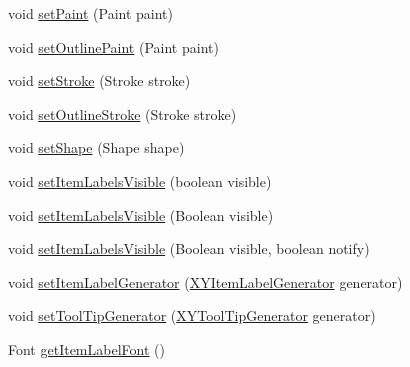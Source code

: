 \begin{DoxyCompactItemize}
\item 
void \mbox{\hyperlink{interfaceorg_1_1jfree_1_1chart_1_1renderer_1_1xy_1_1_x_y_item_renderer_aa9b5df17f4ddc8fa6f034e8facbbfac3}{set\+Paint}} (Paint paint)
\item 
void \mbox{\hyperlink{interfaceorg_1_1jfree_1_1chart_1_1renderer_1_1xy_1_1_x_y_item_renderer_afc0e80460d35d83afc906fede1089eeb}{set\+Outline\+Paint}} (Paint paint)
\item 
void \mbox{\hyperlink{interfaceorg_1_1jfree_1_1chart_1_1renderer_1_1xy_1_1_x_y_item_renderer_a473ce909b6895b827ae52a038a1cde4a}{set\+Stroke}} (Stroke stroke)
\item 
void \mbox{\hyperlink{interfaceorg_1_1jfree_1_1chart_1_1renderer_1_1xy_1_1_x_y_item_renderer_ab211328ae1646de135cfaa7b88b07a0a}{set\+Outline\+Stroke}} (Stroke stroke)
\item 
void \mbox{\hyperlink{interfaceorg_1_1jfree_1_1chart_1_1renderer_1_1xy_1_1_x_y_item_renderer_aca76bd279cbe0daa28abee703ce872c7}{set\+Shape}} (Shape shape)
\item 
void \mbox{\hyperlink{interfaceorg_1_1jfree_1_1chart_1_1renderer_1_1xy_1_1_x_y_item_renderer_a9805685b3c5802635d141addf290fc25}{set\+Item\+Labels\+Visible}} (boolean visible)
\item 
void \mbox{\hyperlink{interfaceorg_1_1jfree_1_1chart_1_1renderer_1_1xy_1_1_x_y_item_renderer_aaa1db57ae471204a43bfabfc6d8adbc2}{set\+Item\+Labels\+Visible}} (Boolean visible)
\item 
void \mbox{\hyperlink{interfaceorg_1_1jfree_1_1chart_1_1renderer_1_1xy_1_1_x_y_item_renderer_a1f35e9f8af8e853e5abea2b63f67afd8}{set\+Item\+Labels\+Visible}} (Boolean visible, boolean notify)
\item 
void \mbox{\hyperlink{interfaceorg_1_1jfree_1_1chart_1_1renderer_1_1xy_1_1_x_y_item_renderer_ac0a393bdb421d5fae14a1c5b0a0dc95b}{set\+Item\+Label\+Generator}} (\mbox{\hyperlink{interfaceorg_1_1jfree_1_1chart_1_1labels_1_1_x_y_item_label_generator}{X\+Y\+Item\+Label\+Generator}} generator)
\item 
void \mbox{\hyperlink{interfaceorg_1_1jfree_1_1chart_1_1renderer_1_1xy_1_1_x_y_item_renderer_a66bfc42c0fe920c7eee1fc6c8c9ff066}{set\+Tool\+Tip\+Generator}} (\mbox{\hyperlink{interfaceorg_1_1jfree_1_1chart_1_1labels_1_1_x_y_tool_tip_generator}{X\+Y\+Tool\+Tip\+Generator}} generator)
\item 
Font \mbox{\hyperlink{interfaceorg_1_1jfree_1_1chart_1_1renderer_1_1xy_1_1_x_y_item_renderer_a371068382c4b348bf9fc7dd65818cef3}{get\+Item\+Label\+Font}} ()
\item 

\end{DoxyCompactItemize}

